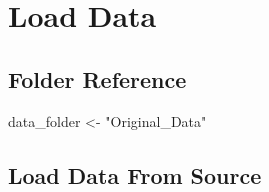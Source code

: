 \documentclass[
]{article}
\newenvironment{Shaded}{\begin{snugshade}}{\end{snugshade}}
\newcommand{\NormalTok}[1]{#1}
\newcommand{\OtherTok}[1]{\textcolor[rgb]{0.56,0.35,0.01}{#1}}
\newcommand{\StringTok}[1]{\textcolor[rgb]{0.31,0.60,0.02}{#1}}
\begin{document}
\hypertarget{load-data}{%
\section{Load Data}\label{load-data}}

\hypertarget{folder-reference}{%
\subsection{Folder Reference}\label{folder-reference}}

\begin{Shaded}
\begin{Highlighting}[]
\NormalTok{data\_folder }\OtherTok{\textless{}{-}} \StringTok{"Original\_Data"}
\end{Highlighting}
\end{Shaded}

\hypertarget{load-data-from-source}{%
\subsection{Load Data From Source}\label{load-data-from-source}}
\end{document}
